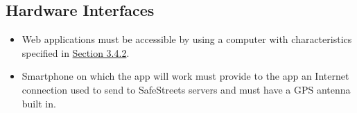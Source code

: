 \documentclass[../../../RASD.tex]{subfiles}
\begin{document}
\subsection{Hardware Interfaces\label{sect:3.1.2}}
	\begin{itemize}
\item Web applications must be accessible by  using a computer with characteristics specified in \hyperref[sect:3.4.2]{Section 3.4.2}. 
\item Smartphone on which the app will work must provide to the app an Internet connection used to send  to SafeStreets servers and must have a GPS antenna built in. 

\end{itemize}
\end{document}
